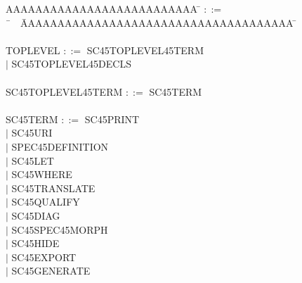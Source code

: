 
\newcommand{\bnf}[1]           {{#1}}
\newcommand{\bnfoptionalopen}  {{\bnf{$\big[$}    }}
\newcommand{\bnfoptionalclose} {{\bnf{$\big]$}    }}
\newcommand{\bnfrepeatopen}    {{\bnf{$\big\{$}   }}
\newcommand{\bnfrepeatclose}   {{\bnf{$\big\}^*$} }}
\newcommand{\bnfalternative}   {{\bnf{$|$}       }}

\newcommand{\grnonterminal}[1] {{\textup{\textsc {#1}} }}

\newcommand{\grterminal}[1]    {{\underline {\textup {\texttt {#1}}} }}

\newcommand{\grcomment}[1]    {{\textit {\textrm {#1}}}}

{\em
\begin{tabbing}
AAAAAAAAAAAAAAAAAAAAAAAAAA \= $::=$\=  \ \ \ \= AAAAAAAAAAAAAAAAAAAAAAAAAAAAAAAAAAAAA \= \kill
\\
\\ \grnonterminal {TOPLEVEL} \> $::=$ \> \>   \grnonterminal {SC\char45TOPLEVEL\char45TERM} 
\\  \>  \>   \bnfalternative \>  \grnonterminal {SC\char45TOPLEVEL\char45DECLS}
\\
\\ \grnonterminal {SC\char45TOPLEVEL\char45TERM} \> $::=$ \> \>    \grnonterminal {SC\char45TERM}
\\
\\ \grnonterminal {SC\char45TERM} \> $::=$ \> \>   \grnonterminal {SC\char45PRINT} 
\\  \>  \>   \bnfalternative \>  \grnonterminal {SC\char45URI} 
\\  \>  \>   \bnfalternative \>  \grnonterminal {SPEC\char45DEFINITION} 
\\  \>  \>   \bnfalternative \>  \grnonterminal {SC\char45LET} 
\\  \>  \>   \bnfalternative \>  \grnonterminal {SC\char45WHERE} 
\\  \>  \>   \bnfalternative \>  \grnonterminal {SC\char45TRANSLATE} 
\\  \>  \>   \bnfalternative \>  \grnonterminal {SC\char45QUALIFY} 
\\  \>  \>   \bnfalternative \>  \grnonterminal {SC\char45DIAG} 
\\  \>  \>   \bnfalternative \>  \grnonterminal {SC\char45SPEC\char45MORPH} 
\\  \>  \>   \bnfalternative \>  \grnonterminal {SC\char45HIDE} 
\\  \>  \>   \bnfalternative \>  \grnonterminal {SC\char45EXPORT} 
\\  \>  \>   \bnfalternative \>  \grnonterminal {SC\char45GENERATE}

\end{tabbing}}
